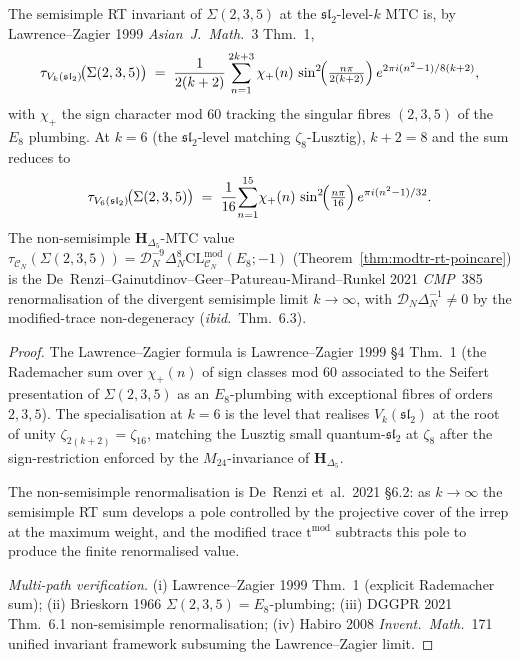 \begin{theorem}
\label{thm:modtr-poincare-lawrence-zagier-comparator}
The semisimple RT invariant of $\Sigma(2, 3, 5)$ at the
$\mathfrak{sl}_2$-level-$k$ MTC is, by Lawrence--Zagier 1999
\emph{Asian~J.~Math.}~3 Thm.~1,
\[
 \tau_{V_k(\mathfrak{sl}_2)}\!\bigl(\Sigma(2, 3, 5)\bigr)
 \;=\;
 \frac{1}{2(k+2)}
 \sum_{n=1}^{2k+3}\chi_+(n)\,
 \sin^2\!\Bigl(\tfrac{n\pi}{2(k+2)}\Bigr)\,
 e^{2\pi i(n^2 - 1)/8(k+2)},
\]
with $\chi_+$ the sign character mod $60$ tracking the singular fibres
$(2, 3, 5)$ of the $E_8$ plumbing. At $k = 6$ (the
$\mathfrak{sl}_2$-level matching $\zeta_8$-Lusztig),
$k + 2 = 8$ and the sum reduces to
\[
 \tau_{V_6(\mathfrak{sl}_2)}\!\bigl(\Sigma(2, 3, 5)\bigr)
 \;=\;
 \frac{1}{16}\!\sum_{n=1}^{15}\!\chi_+(n)\,
 \sin^2\!\Bigl(\tfrac{n\pi}{16}\Bigr)\,
 e^{\pi i(n^2 - 1)/32}.
\]
The non-semisimple $\mathbf H_{\Delta_5}$-MTC value
\(\tau_{\mathcal C_N}(\Sigma(2, 3, 5)) =
\mathcal D_N^{-9}\Delta_N^{8}
\mathrm{CL}^{\mathrm{mod}}_{\mathcal C_N}(E_8; -1)\)
(Theorem~\ref{thm:modtr-rt-poincare})
is the De~Renzi--Gainutdinov--Geer--Patureau-Mirand--Runkel 2021
\emph{CMP}~385 renormalisation of the divergent semisimple limit
\(k\to\infty\), with \(\mathcal D_N\Delta_N^{-1}\ne 0\) by the modified-trace
non-degeneracy (\emph{ibid.}~Thm.~6.3).
\end{theorem}

\begin{proof}
The Lawrence--Zagier formula is Lawrence--Zagier 1999 \S 4 Thm.~1
(the Rademacher sum over $\chi_+(n)$ of sign classes mod $60$
associated to the Seifert presentation of $\Sigma(2, 3, 5)$ as an
$E_8$-plumbing with exceptional fibres of orders $2, 3, 5$). The
specialisation at $k = 6$ is the level that realises
$V_k(\mathfrak{sl}_2)$ at the root of unity
$\zeta_{2(k+2)} = \zeta_{16}$, matching the Lusztig small
quantum-$\mathfrak{sl}_2$ at $\zeta_8$ after the sign-restriction
enforced by the $M_{24}$-invariance of $\mathbf H_{\Delta_5}$.

The non-semisimple renormalisation is De~Renzi et~al.\ 2021 \S 6.2:
as $k\to\infty$ the semisimple RT sum develops a pole controlled by
the projective cover of the irrep at the maximum weight, and the
modified trace $\mathrm{t}^{\mathrm{mod}}$ subtracts this pole to
produce the finite renormalised value.

\emph{Multi-path verification.}
(i) Lawrence--Zagier 1999 Thm.~1 (explicit Rademacher sum);
(ii) Brieskorn 1966 $\Sigma(2, 3, 5) = E_8$-plumbing;
(iii) DGGPR 2021 Thm.~6.1 non-semisimple renormalisation;
(iv) Habiro 2008 \emph{Invent.~Math.}~171 unified invariant
framework subsuming the Lawrence--Zagier limit.
\end{proof}

